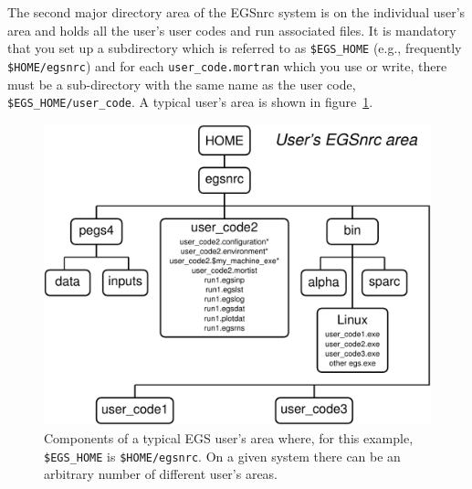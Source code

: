 \clearpage

The second major  directory area of the EGSnrc system is
on the individual user's area and holds all the user's user codes and run associated
files.
It is mandatory that you set up a subdirectory which is referred to as
\verb+$EGS_HOME+ (e.g.,  frequently \verb+$HOME/egsnrc+) and for
each \verb+user_code.mortran+ which you use or write, there must be a sub-directory with
the same name as the user code, \ie~ \verb+$EGS_HOME/user_code+.
A typical user's area is shown in figure~\ref{fig_nrc_users_area}.
\begin{figure}[htb]
\begin{center}
\leavevmode
\mbox{}\hspace{-1cm}
\includegraphics[width=14cm]{figures/users_egsnrc_area}
 \caption{Components of a typical EGS user's area where, for this
 example, {\tt \$EGS\_HOME} is {\tt \$HOME/egsnrc}. On a given system
 there can be an arbitrary number of different user's areas.
 \label{fig_nrc_users_area}
 }
\end{center}
\end{figure}

